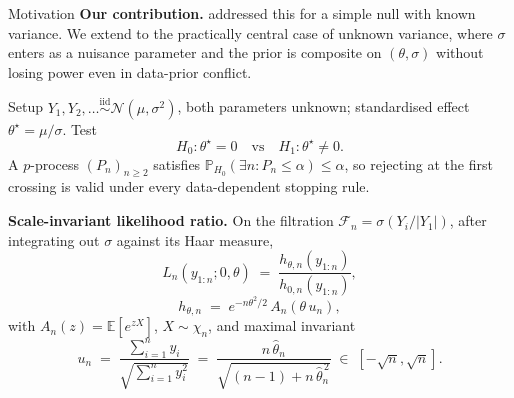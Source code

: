 \documentclass[final]{beamer}
\newcommand{\E}{\mathbb{E}}
\newcommand{\Prob}{\mathbb{P}}
\newcommand{\thetahat}{\widehat{\theta}_n}
\newlength{\colwidth}
\begin{document}
\begin{frame}[t]
\begin{columns}[t]
\begin{column}{\colwidth}
\begin{block}{Motivation}
\textbf{Our contribution.} \cite{Cortinovis2025} addressed this for a simple null with known variance. We extend to the practically central case of \alert{unknown variance}, where $\sigma$ enters as a nuisance parameter and the prior is composite on $(\theta,\sigma)$ without losing power even in data-prior conflict. %
\end{block}
  \begin{block}{Setup}
$Y_1,Y_2,\ldots\stackrel{\mathrm{iid}}{\sim}\mathcal N(\mu,\sigma^2)$, both parameters unknown; standardised effect $\theta^\star=\mu/\sigma$. Test
    \[
      H_0\colon\theta^\star=0 \quad\text{vs}\quad H_1\colon\theta^\star\neq 0.
    \]
    A \alert{$p$-process} $(P_n)_{n\ge 2}$ satisfies $\Prob_{H_0}(\exists n\colon P_n\le\alpha)\le\alpha$, so rejecting at the first crossing is valid under every data-dependent stopping rule.
    
    \textbf{Scale-invariant likelihood ratio.} On the filtration $\mathcal F_n=\sigma(Y_i/|Y_1|)$, after integrating out $\sigma$ against its Haar measure,
    \[
      L_n(y_{1:n};0,\theta) \;=\; \frac{h_{\theta,n}(y_{1:n})}{h_{0,n}(y_{1:n})},\]
      \[
      h_{\theta,n}\;=\;e^{-n\theta^{2}/2}\,A_n(\theta\,u_n),
    \]
    with $A_n(z)=\E[e^{zX}]$, $X\sim\chi_n$, and maximal invariant
    \[
      u_n \;=\; \frac{\sum_{i=1}^n y_i}{\sqrt{\sum_{i=1}^n y_i^{2}}}
           \;=\; \frac{n\,\thetahat}{\sqrt{(n-1)+n\,\thetahat^{\,2}}}\;\in\;[-\sqrt n,\sqrt n].
    \]


\end{block}
\end{column}
\end{columns}
\end{frame}
\end{document}

